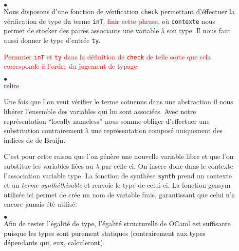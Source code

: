 \documentclass {article}
\newcommand{\codefrom}[3]
           {}
\theoremstyle{definition}
\theoremstyle{remark}
\newcommand{\todo}[1]{\textcolor{red}{#1}}
\newcommand{\fun}[1]{\lstinline!#1!}
\begin{document}
\begin{itemize}
  
\item[$\bullet$] \\
  
  Nous disposons d'une fonction de vérification \lstinline!check!
  permettant d'éffectuer la vérification de type du terme \fun{inT}.
  \todo{finir cette phrase.}
  où \fun{contexte} nous permet de stocker
  des paires associants une variable à son type. Il nous faut aussi
  donner le type d'entrée \fun{ty}.
    
  \todo{Permuter \lstinline!inT! et \lstinline!ty! dans la définition de
    \lstinline!check! de telle sorte que cela corresponde à l'ordre du
    jugement de typage.}
  \codefrom{typed}{lambda}{check_def} 
  
\item[$\bullet$]  \\
  
  \todo{relire}

  Une fois que l'on veut vérifier le terme cotnenus dans une abstraction il nous libérer l'ensemble des variables
  qui lui sont associées. Avec notre représentation ``locally nameless'' nous somme obliger d'effectuer une substitution
  contrairement à une représentation composé uniquement des indices de de Bruijn.
  
  C'est pour cette raison que l'on génère une nouvelle variable libre et que l'on substitue les variables liées 
  au $\lambda$ par celle ci. On insère donc dans le contexte l'association variable type.
  La fonction de synthèse \lstinline!synth! prend un contexte et un
  \emph{terme synthéthisable} et renvoie le type de celui-ci.
  La fonction gensym utilisée ici permet de crée un nom de variable frais, garantissant que celui n'a encore jamais
été utilisé. 
%
 \codefrom{typed}{lambda}{check_abs}

\item[$\bullet$]  \\


Afin de tester l'égalité de type, l'égalité structurelle de OCaml est
suffisante puisque les types sont purement statiques (contrairement
aux types dépendants qui, eux, calculeront).
%
\codefrom{typed}{lambda}{check_inv}
  


\end{itemize}
\end{document}
